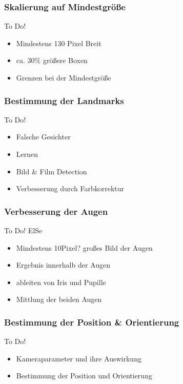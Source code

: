 \subsubsection{Skalierung auf Mindestgröße}
\label{skalierung}
To Do!
\begin{itemize}
\item Mindestens 130 Pixel Breit
\item ca. $30\%$ größere Boxen
\item Grenzen bei der Mindestgröße
\end{itemize}

\subsubsection{Bestimmung der Landmarks}
\label{bestimmung_Landmarks}
To Do!
\begin{itemize}
\item Falsche Gesichter
\item Lernen
\item Bild \& Film Detection
\item Verbesserung durch Farbkorrektur
\end{itemize}

\subsubsection{Verbesserung der Augen}
\label{verbesserung_ElSe}
To Do! ElSe
\begin{itemize}
\item Mindestens 10Pixel? großes Bild der Augen
\item Ergebnis innerhalb der Augen
\item ableiten von Iris und Pupille
\item Mittlung der beiden Augen
\end{itemize}

\subsubsection{Bestimmung der Position \& Orientierung}
\label{bestimmung_Pos}
To Do!
\begin{itemize}
\item Kameraparameter und ihre Auswirkung
\item Bestimmung der Position und Orientierung
\end{itemize}